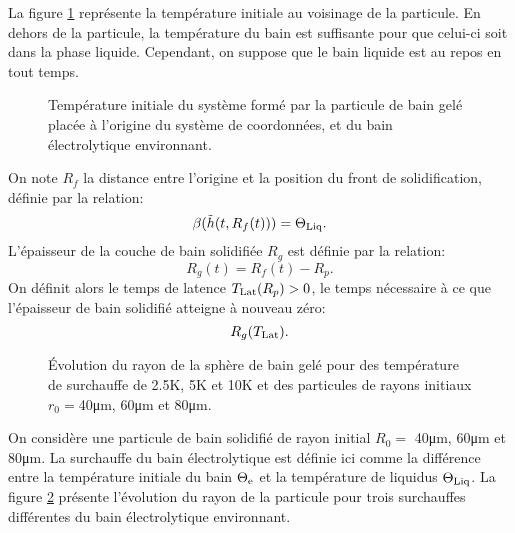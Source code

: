 La figure \ref{fig:particle-initial-temperature} représente la
température initiale au voisinage de la particule. En dehors de la
particule, la température du bain est suffisante pour que celui-ci
soit dans la phase liquide. Cependant, on suppose que le bain liquide
est au repos en tout temps.

\begin{figure}[h]
  \begin{center}
    
    \caption{Température initiale du système formé par la particule de
      bain gelé placée à l'origine du système de coordonnées, et du
      bain électrolytique environnant.}
    \label{fig:particle-initial-temperature}
  \end{center}
\end{figure}

On note $R_f$ la distance entre l'origine et la position du front de
solidification, définie par la relation:
\begin{equation}
\beta(\tilde{h}(t, R_f(t))) = \Theta_\text{Liq}.
\end{equation}
L'épaisseur de la couche de bain solidifiée $R_g$ est définie par la
relation:
\begin{equation}
R_g(t) = R_f(t) - R_p.
\end{equation}
On définit alors le temps de latence $T_\text{Lat}(R_p) > 0$, le temps
nécessaire à ce que l'épaisseur de bain solidifié atteigne à nouveau
zéro:
\begin{equation}
  R_g(T_\text{Lat}).
\end{equation}

\begin{figure}
\begin{center}
  
  
  
  \caption{Évolution du rayon de la sphère de bain gelé pour des
    température de surchauffe de \num{2.5}\si{\kelvin},
    \num{5}\si{\kelvin} et \num{10}\si{\kelvin} et des particules de
    rayons initiaux $r_0 = $\num{40}\si{\micro\meter},
    \num{60}\si{\micro\meter} et \num{80}\si{\micro\meter}.}
  \label{fig:freeze-radius}
\end{center}
\end{figure}
On considère une particule de bain solidifié de rayon initial $R_0 =$
\num{40}\si{\micro\meter}, \num{60}\si{\micro\meter} et
\num{80}\si{\micro\meter}. La surchauffe du bain électrolytique est
définie ici comme la différence entre la température initiale du bain
$\Theta_\mathrm{e}$ et la température de liquidus $\Theta_\text{Liq}$. La figure
\ref{fig:freeze-radius} présente l'évolution du rayon de la particule
pour trois surchauffes différentes du bain électrolytique environnant.

